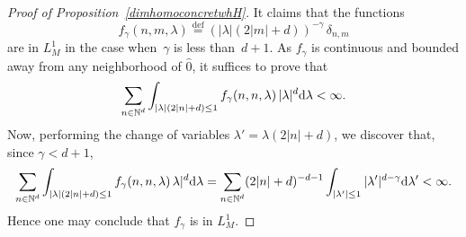 \documentclass[AHL,Unicode,longabstracts]{cedram}
\let\wh=\widehat
\def\N{\mathop{\mathbb N\kern 0pt}\nolimits}
\newcommand{\lam}{\lambda}
\newcommand{\wh}{\widehat}
\newcommand*\N{\mathbb{N}}
\newcommand*\eqdefa{\overset{\mathrm{def}}{=}}
\newcommand*{\dd}{\mathrm{d}}
\newcommand{\dlam}{\dd \lambda}
\begin{document}
\begin{proof}[Proof of Proposition~\ref{dimhomoconcretwhH}] It claims that the functions
\[
f_\gamma (n,m,\lam) \eqdefa \left(|\lam| (2|m|+d)\right) ^{-\gamma} \, \delta_{n,m}
\]
are in $L^1_M$ in the case when~$\gamma$ is less than~$d+1$. As $f_\gamma$ is continuous and bounded away from any neighborhood of $\wh 0$, it suffices to prove that
\[
\sum_{n\in \N^d} \int_{|\lam| (2|n|+d)\leq 1} f_\gamma(n,n,\lam)\, |\lam|^d \dlam <\infty.
\]
Now, performing the change of variables $ \lam' = \lam (2|n|+d)$, we discover that, since $\gamma<d+1$,
\[
\sum_{n\in \N^d} \int_{|\lam| (2|n|+d)\leq 1} f_\gamma(n,n,\lam)\,\lam|^d \dlam = \sum_{n\in \N^d} (2|n|+d)^{-d-1} \int_{|\lam'|\leq 1} |\lam'| ^{d-\gamma} \dlam'<\infty.
\]
Hence one may conclude that $f_\gamma$ is in $L^1_M$.
\end{proof}
\end{document}
